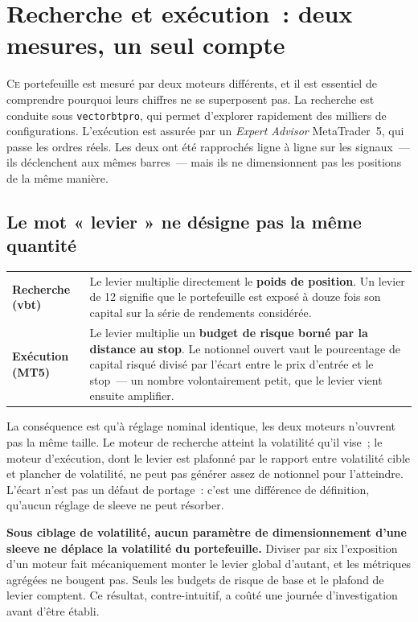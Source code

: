 \section{Recherche et exécution~: deux mesures, un seul compte}
\label{sec:research_vs_execution}

\lettrine[lines=2, findent=2pt, nindent=0pt]{C}{e} portefeuille est mesuré par deux moteurs différents, et il est essentiel de comprendre pourquoi leurs chiffres ne se superposent pas. La recherche est conduite sous \texttt{vectorbtpro}, qui permet d'explorer rapidement des milliers de configurations. L'exécution est assurée par un \emph{Expert Advisor} MetaTrader~5, qui passe les ordres réels. Les deux ont été rapprochés ligne à ligne sur les signaux~--- ils déclenchent aux mêmes barres~--- mais ils ne dimensionnent pas les positions de la même manière.

\subsection{Le mot « levier » ne désigne pas la même quantité}

\begin{center}
\renewcommand{\arraystretch}{1.3}
\begin{tabular}{p{3.4cm}p{10.6cm}}
\toprule
\textbf{Recherche (vbt)} & Le levier multiplie directement le \textbf{poids de position}. Un levier de 12 signifie que le portefeuille est exposé à douze fois son capital sur la série de rendements considérée. \\
\textbf{Exécution (MT5)} & Le levier multiplie un \textbf{budget de risque borné par la distance au stop}. Le notionnel ouvert vaut le pourcentage de capital risqué divisé par l'écart entre le prix d'entrée et le stop~--- un nombre volontairement petit, que le levier vient ensuite amplifier. \\
\bottomrule
\end{tabular}
\end{center}

La conséquence est qu'à réglage nominal identique, les deux moteurs n'ouvrent pas la même taille. Le moteur de recherche atteint la volatilité qu'il vise~; le moteur d'exécution, dont le levier est plafonné par le rapport entre volatilité cible et plancher de volatilité, ne peut pas générer assez de notionnel pour l'atteindre. L'écart n'est pas un défaut de portage~: c'est une différence de définition, qu'aucun réglage de sleeve ne peut résorber.

\begin{insightbox}
\textbf{Sous ciblage de volatilité, aucun paramètre de dimensionnement d'une sleeve ne déplace la volatilité du portefeuille.} Diviser par six l'exposition d'un moteur fait mécaniquement monter le levier global d'autant, et les métriques agrégées ne bougent pas. Seuls les budgets de risque de base et le plafond de levier comptent. Ce résultat, contre-intuitif, a coûté une journée d'investigation avant d'être établi.
\end{insightbox}

